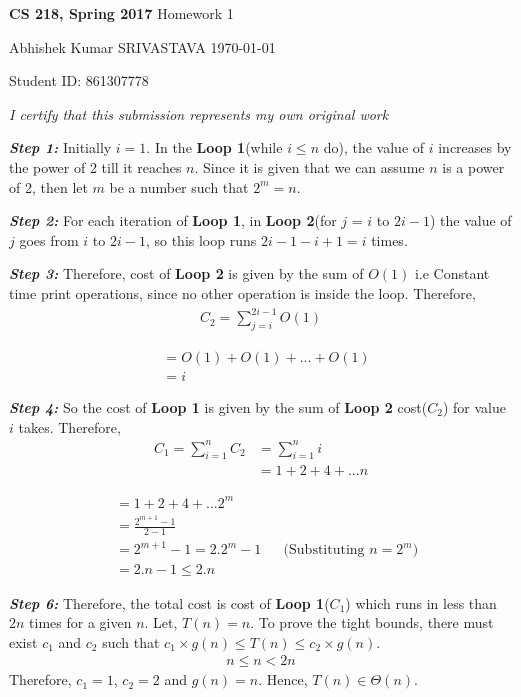 \documentclass[a4paper,11pt]{article}
\renewcommand{\maketitle}{%
	
	\Large
 	\textbf{CS 218, Spring 2017}
 	\hfill
 	Homework 1
 	\par
 	
	\Large
	Abhishek Kumar SRIVASTAVA
	\hfill
	\normalsize
	\today
 	\par
 	Student ID: 861307778
 	\par
 	
 	\begin{center}

 	\vspace{.2in}
 	
 	\textit{I certify that this submission represents my own original work }
 	\par
	\vspace{.2in}
	\makebox[2.0in]{\hrulefill}
	\par

 	\end{center}
 	
 	\hrulefill
 	\par \vspace{2ex}
 	}
\theoremstyle{quest}
\newenvironment{solution}[2][Solution]{\begin{trivlist}
		\item[\hskip \labelsep {\bfseries #1}\hskip \labelsep {\bfseries #2.}]}{\end{trivlist}}
\begin{document}
\thispagestyle{empty}
	
\maketitle

\begin{solution}1	
	\textbf{\textit{Step 1:}} Initially $i = 1$. In the \textbf{Loop 1}(while $i \leq n$ do), the value of $i$ increases by the power of 2 till it reaches $n$. Since it is given that we can assume $n$ is a power of 2, then let $m$ be a number such that $2^{m}=n$. %
	
	\textbf{\textit{Step 2:}} For each iteration of \textbf{Loop 1}, in \textbf{Loop 2}(for $j$ = $i$ to $2i-1$) the value of $j$ goes from $i$ to $2i-1$, so this loop runs $2i-1-i+1 = i$ times.
	
	\textbf{\textit{Step 3:}} Therefore, cost of \textbf{Loop 2} is given by the sum of $O(1)$ i.e Constant time print operations, since no other operation is inside the loop.
	Therefore, 
	\begin{align*}
	C_2=\sum_{j=i}^{2i-1} O(1)
	\end{align*}
	
	\begin{align*}
	&= O(1) + O(1) + . . . + O(1) \\
	&= i
	\end{align*}
	
	\textbf{\textit{Step 4:}} So the cost of \textbf{Loop 1}  is given by the sum of \textbf{Loop 2} cost($C_2$) for value $i$ takes.
	Therefore, 
	\begin{align*}
	C_1 =\sum_{i=1}^{n} C_2 &=\sum_{i=1}^{n} i \\
	&= 1 + 2 + 4 + ... n 
	\end{align*}
	

	\begin{align*}
	&= 1 + 2 + 4 + ... 2^m  \\ 
	&= \frac{2^{m+1} - 1}{2-1}\\
	&= {2^{m+1} - 1} = 2.2^m -1 && \text{(Substituting $n=2^m$)}\\
	&= 2.n -1 \leq 2.n
	\end{align*}

	\textbf{\textit{Step 6:}} Therefore, the total cost is cost of \textbf{Loop 1}($C_1$) which runs in less than $2n$ times for a given $n$. Let, $T(n) = n$. To prove the tight bounds, there must exist $c_1$ and $c_2$ such that $c_1 \times g(n) \leq T(n) \leq c_2 \times g(n)$.
	\begin{align*}
	n \leq n < 2n	
	\end{align*}
	Therefore, $c_1=1$, $c_2=2$ and $g(n)= n$.
	Hence, $T(n) \in \Theta(n)$. 
\end{solution}
\end{document}
